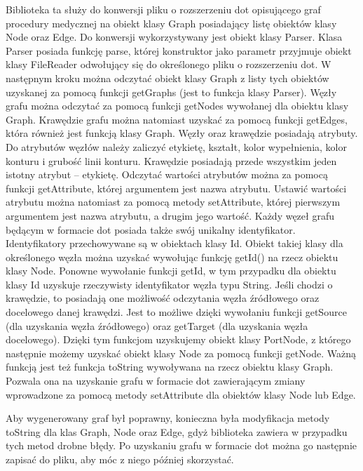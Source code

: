 
Biblioteka\cite{JPGD} ta służy do konwersji pliku o rozszerzeniu dot opisującego graf procedury medycznej na obiekt klasy Graph posiadający listę obiektów klasy Node oraz Edge. Do konwersji wykorzystywany jest obiekt klasy Parser. Klasa Parser posiada funkcję parse, której konstruktor jako parametr przyjmuje obiekt klasy FileReader odwołujący się do określonego pliku o rozszerzeniu dot. W następnym kroku można odczytać obiekt klasy Graph z listy tych obiektów uzyskanej za pomocą funkcji getGraphs (jest to funkcja klasy Parser). Węzły grafu można odczytać za pomocą funkcji getNodes wywołanej dla obiektu klasy Graph. Krawędzie grafu można natomiast uzyskać za pomocą funkcji getEdges, która również jest funkcją klasy Graph. Węzły oraz krawędzie posiadają atrybuty. Do atrybutów węzłów należy zaliczyć etykietę, kształt, kolor wypełnienia, kolor konturu i grubość linii konturu. Krawędzie posiadają przede wszystkim jeden istotny atrybut – etykietę. Odczytać wartości atrybutów można za pomocą funkcji getAttribute, której argumentem jest nazwa atrybutu. Ustawić wartości atrybutu można natomiast za pomocą metody setAttribute, której pierwszym argumentem jest nazwa atrybutu, a drugim jego wartość. Każdy węzeł grafu będącym w formacie dot posiada także swój unikalny identyfikator. Identyfikatory przechowywane są w obiektach klasy Id. Obiekt takiej klasy dla określonego węzła można uzyskać wywołując funkcję getId() na rzecz obiektu klasy Node. Ponowne wywołanie funkcji getId, w tym przypadku dla obiektu klasy Id uzyskuje rzeczywisty identyfikator węzła typu String. Jeśli chodzi o krawędzie, to posiadają one możliwość odczytania węzła źródłowego oraz docelowego danej krawędzi. Jest to możliwe dzięki wywołaniu funkcji getSource (dla uzyskania węzła źródłowego) oraz getTarget (dla uzyskania węzła docelowego). Dzięki tym funkcjom uzyskujemy obiekt klasy PortNode, z którego następnie możemy uzyskać obiekt klasy Node za pomocą funkcji getNode. Ważną funkcją jest też funkcja toString wywoływana na rzecz obiektu klasy Graph. Pozwala ona na uzyskanie grafu w formacie dot zawierającym zmiany wprowadzone za pomocą metody setAttribute dla obiektów klasy Node lub Edge. 

Aby wygenerowany graf był poprawny, konieczna była modyfikacja metody toString dla klas Graph, Node oraz Edge, gdyż biblioteka zawiera w przypadku tych metod drobne błędy. Po uzyskaniu grafu w formacie dot można go następnie zapisać do pliku, aby móc z niego później skorzystać.

